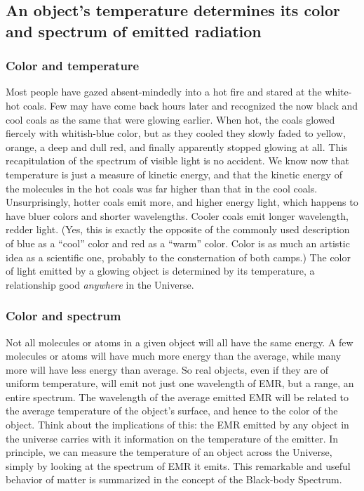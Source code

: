 \subsection{An object's temperature determines its color and spectrum of emitted radiation}
\subsubsection{Color and temperature}
Most people have gazed absent-mindedly into a hot fire and stared at the white-hot coals. Few may have come back hours later and recognized the now black and cool coals as the same that were glowing earlier. When hot, the coals glowed fiercely with whitish-blue color, but as they cooled they slowly faded to yellow, orange, a deep and dull red, and finally apparently stopped glowing at all. This recapitulation of the spectrum of visible light is no accident. We know now that temperature is just a measure of kinetic energy, and that the kinetic energy of the molecules in the hot coals was far higher than that in the cool coals. Unsurprisingly, hotter coals emit more, and higher energy light, which happens to have bluer colors and shorter wavelengths. Cooler coals emit longer wavelength, redder light. (Yes, this is exactly the opposite of the commonly used description of blue as a ``cool'' color and red as a ``warm'' color. Color is as much an artistic idea as a scientific one, probably to the consternation of both camps.) The color of light emitted by a glowing object is determined by its temperature, a relationship good \emph{anywhere} in the Universe. 

\subsubsection{Color and spectrum}
Not all molecules or atoms in a given object will all have the same energy. A few molecules or atoms will have much more energy than the average, while many more will have less energy than average. So real objects, even if they are of uniform temperature, will emit not just one wavelength of EMR, but a range, an entire spectrum. The wavelength of the average emitted EMR will be related to the average temperature of the object's surface, and hence to the color of the object. Think about the implications of this: the EMR emitted by any object in the universe carries with it information on the temperature of the emitter. In principle, we can measure the temperature of an object across the Universe, simply by looking at the spectrum of EMR it emits. This remarkable and useful behavior of matter is summarized in the concept of the Black-body Spectrum.

